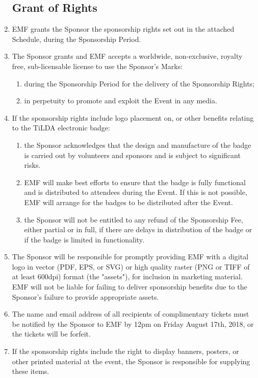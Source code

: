 \begin{enumerate}

\subsection*{Grant of Rights}

\item EMF grants the Sponsor the sponsorship rights set out in the attached Schedule,
during the Sponsorship Period.

\item The Sponsor grants and EMF accepts a worldwide, non-exclusive, royalty free,
sub-licensable license to use the Sponsor's Marks:
\begin{enumerate}
    \item during the Sponsorship Period for the delivery of the Sponsorship Rights;
    \item in perpetuity to promote and exploit the Event in any media.
\end{enumerate}

\item If the sponsorship rights include logo placement on, or other benefits relating to the TiLDA
electronic badge:
\begin{enumerate}
    \item the Sponsor acknowledges that the design and manufacture of the badge is carried out
            by volunteers and sponsors and is subject to significant risks.
    \item EMF will make best efforts to ensure that the badge is fully functional and is
            distributed to attendees during the Event. If this is not possible, EMF
            will arrange for the badges to be distributed after the Event.
    \item the Sponsor will not be entitled to any refund of the Sponsorship Fee, either partial
            or in full, if there are delays in distribution of the badge or if the badge is
            limited in functionality.
\end{enumerate}

\item The Sponsor will be responsible for promptly providing EMF with a digital logo in vector
    (PDF, EPS, or SVG) or high quality raster (PNG or TIFF of at least 600dpi) format (the "assets"),
        for inclusion in marketing material.
        EMF will not be liable for failing to deliver sponsorship benefits due to
        the Sponsor's failure to provide appropriate assets.
\item The name and email address of all recipients of complimentary tickets must be notified by the Sponsor 
        to EMF by 12pm on Friday August 17th, 2018, or the tickets will be forfeit.
\item If the sponsorship rights include the right to display banners, posters, or other printed
        material at the event, the Sponsor is responsible for supplying these items.


\end{enumerate}
